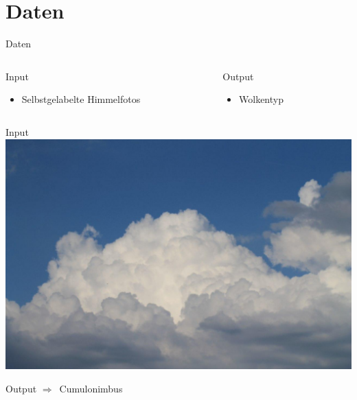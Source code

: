 \section{Daten}%
\label{sec:daten}
\begin{frame}{Daten}
  \begin{columns}
    \begin{column}[t]{0.5\textwidth}
      \begin{block}{Input}
        \begin{itemize}
          \item Selbstgelabelte Himmelfotos
        \end{itemize}
      \end{block}
    \end{column}
    \begin{column}[t]{0.5\textwidth}
      \begin{block}{Output}
        \begin{itemize}
          \item[\Rightarrow] Wolkentyp
        \end{itemize}
      \end{block}
    \end{column}
  \end{columns}
\end{frame}

\begin{frame}{Input}
  \centering
  \includegraphics[width=\textwidth]{content/wolke01.jpg}
\end{frame}

\begin{frame}{Output}
  $\Rightarrow$~Cumulonimbus
\end{frame}

